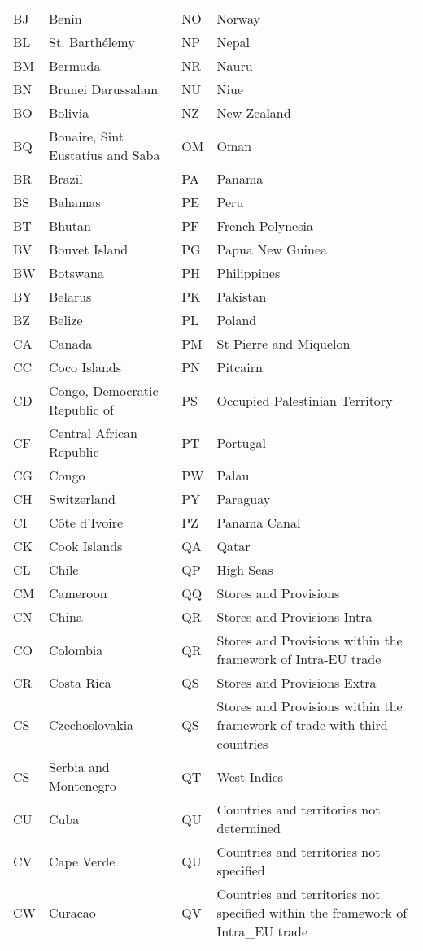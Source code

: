 {\begin{longtable}{lp{5cm}||lp{5cm}}
 BJ & Benin & NO & Norway \\
 BL & St. Barthélemy & NP & Nepal \\
 BM & Bermuda & NR & Nauru \\
 BN & Brunei Darussalam & NU & Niue \\
 BO & Bolivia & NZ & New Zealand \\
 BQ & Bonaire, Sint Eustatius and Saba & OM & Oman \\
 BR & Brazil & PA & Panama \\
 BS & Bahamas & PE & Peru \\
 BT & Bhutan & PF & French Polynesia \\
 BV & Bouvet Island & PG & Papua New Guinea \\
 BW & Botswana & PH & Philippines \\
 BY & Belarus & PK & Pakistan \\
 BZ & Belize & PL & Poland \\
 CA & Canada & PM & St Pierre and Miquelon \\
 CC & Coco Islands & PN & Pitcairn \\
 CD & Congo, Democratic Republic of & PS & Occupied Palestinian Territory \\
 CF & Central African Republic & PT & Portugal \\
 CG & Congo & PW & Palau \\
 CH & Switzerland & PY & Paraguay \\
 CI & Côte d'Ivoire & PZ & Panama Canal \\
 CK & Cook Islands & QA & Qatar \\
 CL & Chile & QP & High Seas \\
 CM & Cameroon & QQ & Stores and Provisions \\
 CN & China & QR & Stores and Provisions Intra \\
 CO & Colombia & QR & Stores and Provisions within the framework of Intra-EU trade \\
 CR & Costa Rica & QS & Stores and Provisions Extra \\
 CS & Czechoslovakia & QS & Stores and Provisions within the framework of trade with third countries \\
 CS & Serbia and Montenegro & QT & West Indies \\
 CU & Cuba & QU & Countries and territories not determined \\
 CV & Cape Verde & QU & Countries and territories not specified \\
 CW & Curacao & QV & Countries and territories not specified within the framework of Intra\_EU trade \\

\end{longtable}}
